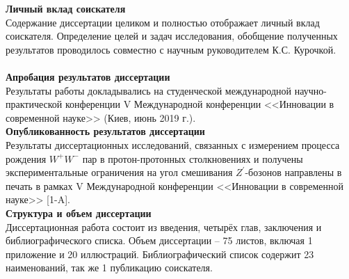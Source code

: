 \textbf{Личный вклад соискателя}\\

Содержание диссертации целиком и полностью отображает личный вклад соискателя. Определение целей и задач исследования, обобщение полученных результатов проводилось совместно с научным руководителем К.С. Курочкой.\\

\\

\textbf{Апробация результатов диссертации}\\

Результаты работы докладывались на студенческой международной научно-практической конференции V Международной конференции <<Инновации в современной науке>> (Киев, июнь 2019 г.).
\\

\textbf{Опубликованность результатов диссертации}\\

Результаты диссертационных исследований, связанных с измерением процесса рождения ${W}^{+}{W}^{-}$ пар в протон-протонных столкновениях и получены экспериментальные ограничения на угол смешивания ${Z}^{\prime}$-бозонов направлены в печать в рамках V Международной конференции <<Инновации в современной науке>> [1-A].
\\

\textbf{Структура и объем диссертации}\\

Диссертационная работа состоит из введения, четырёх глав, заключения и библиографического списка. Объем диссертации – 75 листов, включая 1 приложение и 20 иллюстраций. Библиографический список содержит 23 наименований, так же 1 публикацию соискателя.
